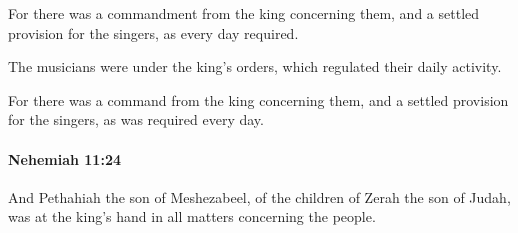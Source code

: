 			\begin{versebox}
					\item[BHS] 
					\item[LXX] 
					\item[ASV] For there was a commandment from the king concerning them, and a settled provision for the singers, as every day required.
					\item[NIV] The musicians were under the king’s orders, which regulated their daily activity.
					\item[NRSV] For there was a command from the king concerning them, and a settled provision for the singers, as was required every day.
			\end{versebox}

		\paragraph{Nehemiah 11:24} %
			\label{NEHEMIAH-11-24}

			And Pethahiah the son of Meshezabeel, of the children of Zerah the son of Judah, was at the king’s hand in all matters concerning the people.

